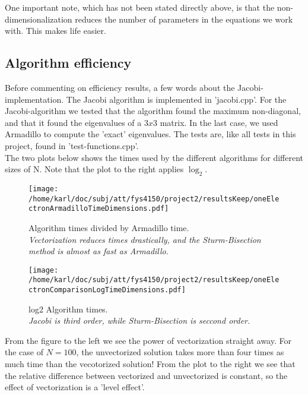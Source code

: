 \documentclass{article}
\begin{document}
One important note, which has not been stated directly above, is that the non-dimensionalization reduces the number of parameters in the equations we work with. This makes life easier.

\subsection{Algorithm efficiency}
Before commenting on efficiency results, a few words about the Jacobi-implementation. The Jacobi algorithm is implemented in 'jacobi.cpp'. For the Jacobi-algorithm we tested that the algorithm found the maximum non-diagonal, and that it found the eigenvalues of a $3 x 3$ matrix. In the last case, we used Armadillo to compute the 'exact' eigenvalues. The tests are, like all tests in this project, found in 'test-functions.cpp'.\\

The two plots below shows the times used by the different algorithms for different sizes of N. Note that the plot to the right applies $\log_2$.

\begin{minipage}{.49\textwidth} %
	\begin{figure}[H]
		\centering
		\texttt{[image: /home/karl/doc/subj/att/fys4150/project2/resultsKeep/oneElectronArmadilloTimeDimensions.pdf]}
		\caption{Algorithm times divided by Armadillo time.\\ \textit{Vectorization reduces times drastically, and the Sturm-Bisection method is almost as fast as Armadillo.}}
		\label{1}
	\end{figure}
\end{minipage}\hfill
\vspace{2ex}
\begin{minipage}{.49\textwidth}
	\begin{figure}[H]
		\centering
		\texttt{[image: /home/karl/doc/subj/att/fys4150/project2/resultsKeep/oneElectronComparisonLogTimeDimensions.pdf]}
		\caption{log2 Algorithm times.\\ \textit{Jacobi is third order, while Sturm-Bisection is seccond order.}}
		\label{1}
	\end{figure}
\end{minipage}\hfill
\vspace{2ex}

From the figure to the left we see the power of vectorization straight away. For the case of $N = 100$, the unvectorized solution takes more than four times as much time than the vecotorized solution! From the plot to the right we see that the relative difference between vectorized and unvectorized is constant, so the effect of vectorization is a 'level effect'. \\
\end{document}
